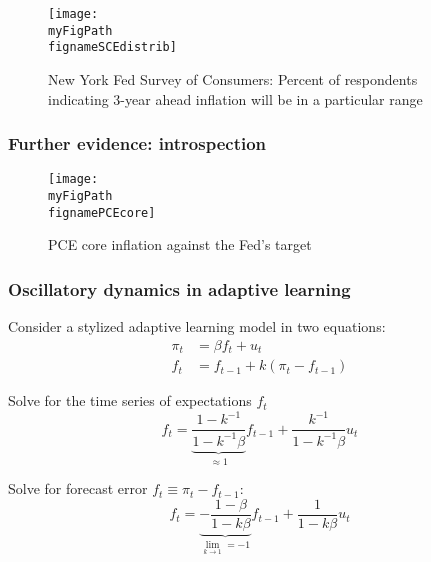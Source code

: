\documentclass[10pt]{beamer}
\def \myFigPath {../../../figures/}
\def\fignameSCEdistrib{SCE_distrib_topbottom_command_anchoring_in_data_14_Sep_2020_18_12_59}
\def\fignamePCEcore{PCE_core_target_command_anchoring_in_data_19_Oct_2020_15_24_30}
\begin{document}
\begin{frame}

\begin{figure}[h!]
\caption{New York Fed Survey of Consumers: \newline Percent of respondents indicating 3-year ahead inflation will be in a particular range}
\texttt{[image: \\myFigPath \\fignameSCEdistrib]}
\label{SCEdistrib}
\end{figure}

\vfill 
\hyperlink{rolling}{}	

\end{frame}

\begin{frame}[plain]  %
	\frametitle{Further evidence: introspection}


\begin{figure}[h!]
\caption{PCE core inflation against the Fed's target}
\texttt{[image: \\myFigPath \\fignamePCEcore]}
\label{PCEcore}
\end{figure}

\vfill 
\hyperlink{rolling}{}	

\end{frame}


\begin{frame}[plain]  %
\frametitle{Oscillatory dynamics in adaptive learning}
	\label{oscillatory}

Consider a stylized adaptive learning model in two equations:
\begin{align}
\pi_t & = \beta f_t + u_t  \\
f_t & = f_{t-1} + k(\pi_t - f_{t-1}) 
\end{align}

Solve for the time series of expectations $f_t$
\begin{equation}
f_t = \underbrace{\frac{1-k^{-1}}{1-k^{-1}\beta}}_{\approx 1}f_{t-1} + \frac{k^{-1}}{1-k^{-1}\beta}u_t
\end{equation}

Solve for forecast error $f_t \equiv \pi_t - f_{t-1}$:
\begin{equation}
f_t = \underbrace{-\frac{1-\beta}{1-k\beta}}_{\lim_{k \to 1} = -1}f_{t-1} + \frac{1}{1-k\beta}u_t 
\end{equation}

\vfill 
\hyperlink{IRF1}{}	

\end{frame}
\end{document}
